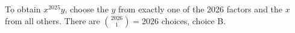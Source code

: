 To obtain $x^{2025}y$, choose the $y$ from exactly one of the 2026 factors and the $x$ from all others. There are $\binom{2026}{1}=\boxed{2026}$ choices, choice B.
